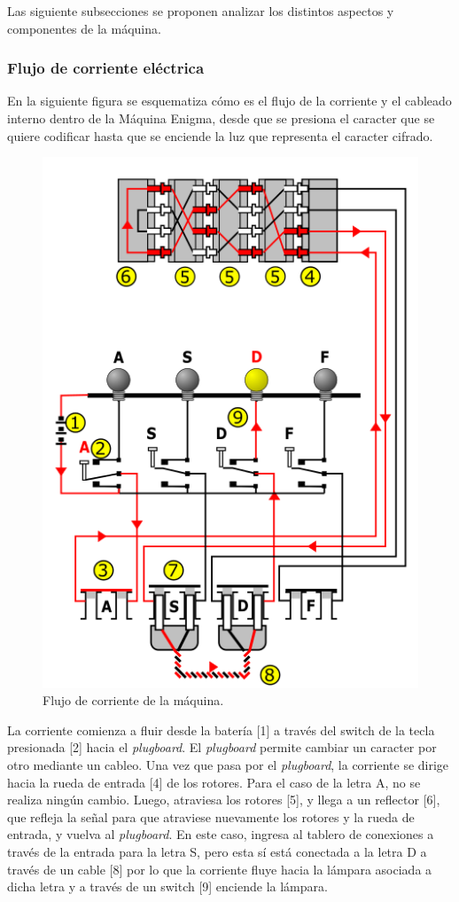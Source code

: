 \documentclass[a4paper,10pt]{article}
\begin{document}
Las siguiente subsecciones se proponen analizar los distintos aspectos y componentes de la máquina.

\subsubsection{Flujo de corriente eléctrica}

En la siguiente figura se esquematiza cómo es el flujo de la corriente y el cableado interno dentro de la Máquina Enigma, desde que se presiona el caracter que se quiere codificar hasta que se enciende la luz que representa el caracter cifrado. 

\begin{figure}[H]
    \centering
    \includegraphics[scale=0.4]{current-flow.png}
    \caption{Flujo de corriente de la máquina.\cite{wikimedia3}}
    \label{fig:my_label}
\end{figure}

La corriente comienza a fluir desde la batería [1] a través del switch de la tecla presionada [2] hacia el \textit{plugboard}. El \textit{plugboard} permite cambiar un caracter por otro mediante un cableo. Una vez que pasa por el \textit{plugboard}, la corriente se dirige hacia la rueda de entrada [4] de los rotores. Para el caso de la letra A, no se realiza ningún cambio. Luego, atraviesa los rotores [5], y llega a un reflector [6], que refleja la señal para que atraviese nuevamente los rotores y la rueda de entrada, y vuelva al \textit{plugboard}. En este caso, ingresa al tablero de conexiones a través de la entrada para la letra S, pero esta sí está conectada a la letra D a través de un cable [8] por lo que la corriente fluye hacia la lámpara asociada a dicha letra y a través de un switch [9] enciende la lámpara.
\end{document}
